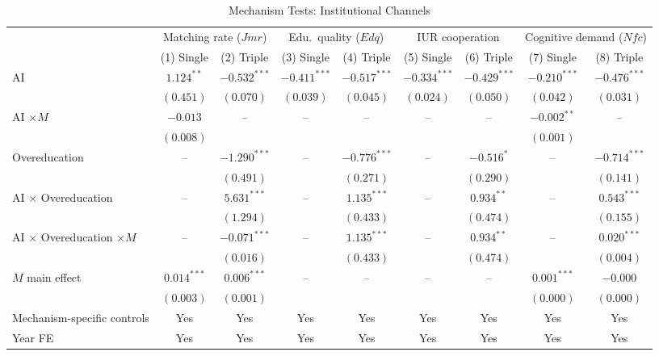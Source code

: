 \documentclass[12pt,a4paper]{article}
\theoremstyle{predstyle}
\theoremstyle{plain}
\newcommand{\Jmr}{\mathit{Jmr}}
\newcommand{\Edq}{\mathit{Edq}}
\newcommand{\Nfc}{\mathit{Nfc}}
\begin{document}
\begin{landscape}
\begin{table}[H]
\centering
\caption{Mechanism Tests: Institutional Channels}
\label{tab:mechanisms}
\begin{threeparttable}
\scriptsize
\begin{tabular}{lcccccccc}
\toprule
 & \multicolumn{2}{c}{Matching rate (\(\Jmr\))} & \multicolumn{2}{c}{Edu.\ quality (\(\Edq\))} & \multicolumn{2}{c}{IUR cooperation} & \multicolumn{2}{c}{Cognitive demand (\(\Nfc\))} \\
\cmidrule(lr){2-3}\cmidrule(lr){4-5}\cmidrule(lr){6-7}\cmidrule(lr){8-9}
 & (1) Single & (2) Triple & (3) Single & (4) Triple & (5) Single & (6) Triple & (7) Single & (8) Triple \\
\midrule
AI & \(1.124^{**}\) & \(-0.532^{***}\) & \(-0.411^{***}\) & \(-0.517^{***}\) & \(-0.334^{***}\) & \(-0.429^{***}\) & \(-0.210^{***}\) & \(-0.476^{***}\) \\
 & \((0.451)\) & \((0.070)\) & \((0.039)\) & \((0.045)\) & \((0.024)\) & \((0.050)\) & \((0.042)\) & \((0.031)\) \\
AI \(\times M\) & \(-0.013\) & -- & -- & -- & -- & -- & \(-0.002^{**}\) & -- \\
 & \((0.008)\) & & & & & & \((0.001)\) & \\
Overeducation & -- & \(-1.290^{***}\) & -- & \(-0.776^{***}\) & -- & \(-0.516^{*}\) & -- & \(-0.714^{***}\) \\
 & & \((0.491)\) & & \((0.271)\) & & \((0.290)\) & & \((0.141)\) \\
AI \(\times\) Overeducation & -- & \(5.631^{***}\) & -- & \(1.135^{***}\) & -- & \(0.934^{**}\) & -- & \(0.543^{***}\) \\
 & & \((1.294)\) & & \((0.433)\) & & \((0.474)\) & & \((0.155)\) \\
AI \(\times\) Overeducation \(\times M\) & -- & \(-0.071^{***}\) & -- & \(1.135^{***}\) & -- & \(0.934^{**}\) & -- & \(0.020^{***}\) \\
 & & \((0.016)\) & & \((0.433)\) & & \((0.474)\) & & \((0.004)\) \\
\(M\) main effect & \(0.014^{***}\) & \(0.006^{***}\) & -- & -- & -- & -- & \(0.001^{***}\) & \(-0.000\) \\
 & \((0.003)\) & \((0.001)\) & & & & & \((0.000)\) & \((0.000)\) \\
Mechanism-specific controls & Yes & Yes & Yes & Yes & Yes & Yes & Yes & Yes \\
Year FE & Yes & Yes & Yes & Yes & Yes & Yes & Yes & Yes \\

\end{tabular}
\end{threeparttable}
\end{table}
\end{landscape}
\end{document}
